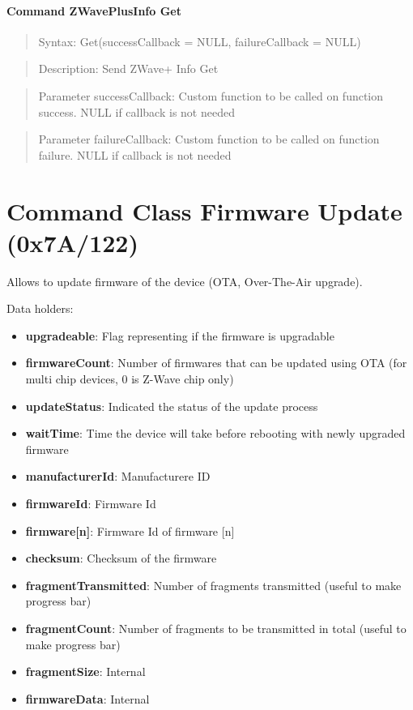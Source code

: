 \paragraph{Command ZWavePlusInfo Get}
\begin{quote}Syntax: Get(successCallback = NULL, failureCallback = NULL)\end{quote}
\begin{quote}Description: Send ZWave+ Info Get\end{quote}
\begin{quote}Parameter successCallback: Custom function to be called on function success. NULL if callback is not needed\end{quote}
\begin{quote}Parameter failureCallback: Custom function to be called on function failure. NULL if callback is not needed\end{quote}



\section{Command Class Firmware Update (0x7A/122)}

Allows to update firmware of the device (OTA, Over-The-Air upgrade).
\newline

\noindent
Data holders:

\begin{itemize}
\item \textbf{upgradeable}: Flag representing if the firmware is upgradable
\item \textbf{firmwareCount}: Number of firmwares that can be updated using OTA (for multi chip devices, 0 is Z-Wave chip only)
\item \textbf{updateStatus}: Indicated the status of the update process
\item \textbf{waitTime}: Time the device will take before rebooting with newly upgraded firmware
\item \textbf{manufacturerId}: Manufacturere ID
\item \textbf{firmwareId}: Firmware Id
\item \textbf{firmware[n]}: Firmware Id of firmware [n]
\item \textbf{checksum}: Checksum of the firmware
\item \textbf{fragmentTransmitted}: Number of fragments transmitted (useful to make progress bar)
\item \textbf{fragmentCount}: Number of fragments to be transmitted in total (useful to make progress bar)
\item \textbf{fragmentSize}: Internal
\item \textbf{firmwareData}: Internal
\end{itemize}

